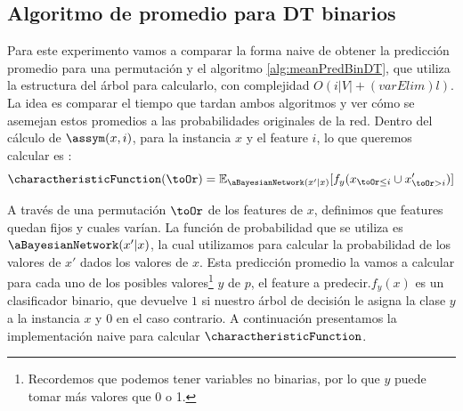 \subsection{Algoritmo de promedio para DT binarios}
\label{subSection:experimentoAlgoritmoPromedio}
Para este experimento vamos a comparar la forma naive de obtener la predicción promedio para una permutación y el algoritmo \ref{alg:meanPredBinDT}, que utiliza la estructura del árbol para calcularlo, con complejidad $O(i|V| + (varElim)l)$. La idea es comparar el tiempo que tardan ambos algoritmos y ver cómo se asemejan estos promedios a las probabilidades originales de la red. Dentro del cálculo de $\assym(x,i)$, para la instancia $x$ y el feature $i$, lo que queremos calcular es :
$$\charactheristicFunction(\toOr) = \mathbb{E}_{\aBayesianNetwork(x' | x)}[f_y(x_{\toOr \leq i} \cup x'_{\toOr > i})]$$


A través de una permutación $\toOr$ de los features de $x$, definimos que features quedan fijos y cuales varían. La función de probabilidad que se utiliza es $\aBayesianNetwork(x' | x)$, la cual utilizamos para calcular la probabilidad de los valores de $x'$ dados los valores de $x$. Esta predicción promedio la vamos a calcular para cada uno de los posibles valores\footnote{Recordemos que podemos tener variables no binarias, por lo que $y$ puede tomar más valores que 0 o 1.} $y$ de $p$, el feature  a predecir.$f_y(x)$ es un clasificador binario, que devuelve $1$ si nuestro árbol de decisión le asigna la clase $y$ a la instancia $x$ y $0$ en el caso contrario. A continuación presentamos la implementación naive para calcular $\charactheristicFunction$. 

